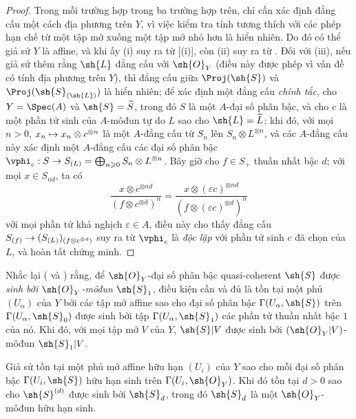 \documentclass[oneside,10pt]{amsart}
\makeatletter
\renewcommand{\geq}{\geqslant}
\newcommand{\ega@arrow}[2]{\mathchoice{#1}{#2}{#2}{#2}}
\let\ega@shortmapsto\mapsto
\renewcommand{\to}{\ega@arrow{\longrightarrow}{\rightarrow}}
\renewcommand{\mapsto}{\ega@arrow{\longmapsto}{\ega@shortmapsto}}
\let\EGAOriginalLabel\label
\renewcommand{\label}[1]{\phantomsection\EGAOriginalLabel{#1}}
\makeatother
\begin{document}
\begin{proof}
Trong mỗi trường hợp trong ba trường hợp trên, chỉ cần xác định đẳng cấu một cách địa phương trên $Y$, vì việc kiểm tra tính tương thích với các phép hạn chế từ một tập mở xuống một tập mở nhỏ hơn là hiển nhiên.
Do đó có thể giả sử $Y$ là affine, và khi ấy (i) suy ra từ [(i)], còn (ii) suy ra từ .
Đối với (iii), nếu giả sử thêm rằng $\sh{L}$ đẳng cấu với $\sh{O}_Y$ (điều này được phép vì vấn đề có tính địa phương trên $Y$), thì đẳng cấu giữa $\Proj(\sh{S})$ và $\Proj(\sh{S}_{(\sh{L})})$ là hiển nhiên;
để xác định một đẳng cấu \emph{chính tắc}, cho $Y=\Spec(A)$ và $\sh{S}=\widetilde{S}$, trong đó $S$ là một $A$-đại số phân bậc, và cho $c$ là một phần tử sinh của $A$-môđun tự do $L$ sao cho $\sh{L}=\widetilde{L}$;
khi đó, với mọi $n>0$, $x_n\mapsto x_n\otimes c^{\otimes n}$ là một $A$-đẳng cấu từ $S_n$ lên $S_n\otimes L^{\otimes n}$, và các $A$-đẳng cấu này xác định một $A$-đẳng cấu các đại số phân bậc $\vphi_c:S\to S_{(L)}=\bigoplus_{n\geq0}S_n\otimes L^{\otimes n}$.
Bây giờ cho $f\in S_+$ thuần nhất bậc $d$;
với mọi $x\in S_{nd}$, ta có
\[
  \frac{x\otimes c^{\otimes nd}}{(f\otimes c^{\otimes d})^n}
  =
  \frac{x\otimes(\varepsilon c)^{\otimes nd}}{(f\otimes(\varepsilon c)^{\otimes d})^n}
\]
với mọi phần tử khả nghịch $\varepsilon\in A$, điều này cho thấy đẳng cấu $S_{(f)}\to(S_{(L)})_{(f\otimes c^{\otimes d})}$ suy ra từ $\vphi_c$ là \emph{độc lập} với phần tử sinh $c$ đã chọn của $L$, và hoàn tất chứng minh.
\end{proof}

\begin{env}[3.1.9]
\label{II.3.1.9}
Nhắc lại ( và ) rằng, để $\sh{O}_Y$-đại số phân bậc quasi-coherent $\sh{S}$ được \emph{sinh bởi $\sh{O}_Y$-môđun $\sh{S}_1$}, điều kiện cần và đủ là tồn tại một phủ $(U_\alpha)$ của $Y$ bởi các tập mở affine sao cho đại số phân bậc $\Gamma(U_\alpha,\sh{S})$ trên $\Gamma(U_\alpha,\sh{S}_0)$ được sinh bởi tập $\Gamma(U_\alpha,\sh{S}_1)$ các phần tử thuần nhất bậc $1$ của nó.
Khi đó, với mọi tập mở $V$ của $Y$, $\sh{S}|V$ được sinh bởi $(\sh{O}_Y|V)$-môđun $\sh{S}_1|V$.
\end{env}

\begin{proposition}[3.1.10]
\label{II.3.1.10}
Giả sử tồn tại một phủ mở affine hữu hạn $(U_i)$ của $Y$ sao cho mỗi đại số phân bậc $\Gamma(U_i,\sh{S})$ hữu hạn sinh trên $\Gamma(U_i,\sh{O}_Y)$.
Khi đó tồn tại $d>0$ sao cho $\sh{S}^{(d)}$ được sinh bởi $\sh{S}_d$, trong đó $\sh{S}_d$ là một $\sh{O}_Y$-môđun hữu hạn sinh.
\end{proposition}
\end{document}
